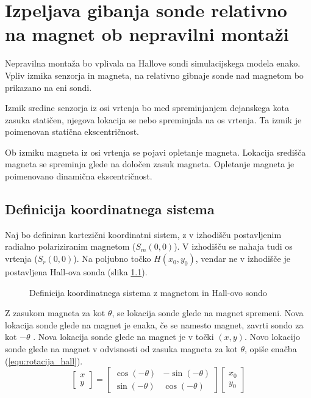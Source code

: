 \chapter{Izpeljava gibanja sonde relativno na magnet ob nepravilni montaži}

Nepravilna montaža bo vplivala na  Hallove sondi simulacijskega modela enako. Vpliv izmika senzorja in magneta, na relativno gibnaje sonde nad magnetom bo prikazano na eni sondi.

Izmik sredine senzorja iz osi vrtenja bo med spreminjanjem dejanskega kota zasuka statičen, njegova lokacija se nebo spreminjala na os vrtenja. Ta izmik je poimenovan statična ekscentričnost.

Ob izmiku magneta iz osi vrtenja se pojavi opletanje magneta. Lokacija središča magneta se spreminja glede na določen zasuk magneta. Opletanje magneta je poimenovano dinamična ekscentričnost.
\section{Definicija koordinatnega sistema}
Naj bo definiran kartezični koordinatni sistem, z v izhodišču postavljenim radialno polariziranim magnetom ($S_m(0, 0)$). V izhodišču se nahaja tudi os vrtenja ($S_r(0, 0)$). Na poljubno točko $H(x_0,y_0)$, vendar ne v
izhodišče je postavljena Hall-ova sonda (slika \ref{fig:def_kks}).
\begin{figure}[!ht]
	\centering
	\caption{Definicija koordinatnega sistema z magnetom in Hall-ovo sondo}
	\label{fig:def_kks}
\end{figure}

Z zasukom magneta za kot $\theta$, se lokacija sonde glede na magnet spremeni. Nova lokacija sonde glede na magnet je enaka, če se namesto magnet, zavrti sondo za kot $-\theta$ . Nova lokacija
sonde glede na magnet je v točki  $(x, y)$. Novo lokacijo sonde glede na magnet v odvisnosti od zasuka magneta za kot $\theta$, opiše enačba (\ref{equ:rotacija_hall}).
\begin{equation}
\label{equ:rotacija_hall}
\begin{bmatrix} x\\y \end{bmatrix}=
\begin{bmatrix} \cos(-\theta)&-\sin(-\theta)\\\sin(-\theta)&\cos(-\theta) \end{bmatrix}
\begin{bmatrix} x_0\\y_0 \end{bmatrix}
\end{equation}


